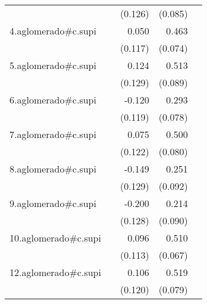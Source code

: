 {\begin{longtable}{l*{4}{D{.}{.}{-1}}}
            &                     &     (0.126)         &     (0.085)         &                     \\
\addlinespace
4.aglomerado#c.supi&                     &       0.050         &       0.463\sym{***}&                     \\
            &                     &     (0.117)         &     (0.074)         &                     \\
\addlinespace
5.aglomerado#c.supi&                     &       0.124         &       0.513\sym{***}&                     \\
            &                     &     (0.129)         &     (0.089)         &                     \\
\addlinespace
6.aglomerado#c.supi&                     &      -0.120         &       0.293\sym{***}&                     \\
            &                     &     (0.119)         &     (0.078)         &                     \\
\addlinespace
7.aglomerado#c.supi&                     &       0.075         &       0.500\sym{***}&                     \\
            &                     &     (0.122)         &     (0.080)         &                     \\
\addlinespace
8.aglomerado#c.supi&                     &      -0.149         &       0.251\sym{**} &                     \\
            &                     &     (0.129)         &     (0.092)         &                     \\
\addlinespace
9.aglomerado#c.supi&                     &      -0.200         &       0.214\sym{*}  &                     \\
            &                     &     (0.128)         &     (0.090)         &                     \\
\addlinespace
10.aglomerado#c.supi&                     &       0.096         &       0.510\sym{***}&                     \\
            &                     &     (0.113)         &     (0.067)         &                     \\
\addlinespace
12.aglomerado#c.supi&                     &       0.106         &       0.519\sym{***}&                     \\
            &                     &     (0.120)         &     (0.079)         &                     \\

\end{longtable}}
